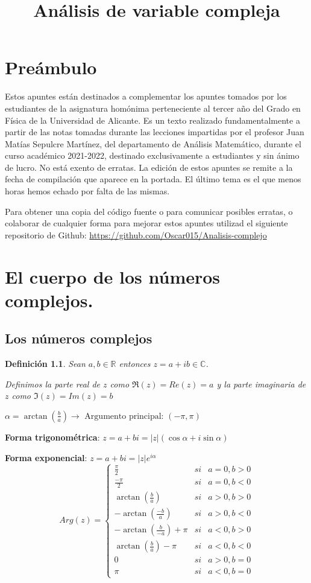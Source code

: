 \documentclass[10pt]{book}
\title{Análisis de variable compleja}
\newtheorem{defi}{Definición}[chapter]
\newcommand{\R}{\mathbb{R}}
\newcommand{\C}{\mathbb{C}}
\begin{document}
\maketitle
\tableofcontents
\chapter*{Preámbulo}
Estos apuntes están destinados a complementar los apuntes tomados por
los estudiantes de la asignatura homónima perteneciente al tercer año del
Grado en Física de la Universidad de Alicante.
Es un texto realizado fundamentalmente a partir de las notas tomadas
durante las lecciones impartidas por el profesor Juan Matías Sepulcre Martínez, del departamento
de Análisis Matemático, durante el curso académico 2021-2022, destinado exclusivamente a estudiantes y sin ánimo de lucro.
No está exento de erratas. La edición de estos apuntes se remite a la fecha de compilación que aparece en la portada. El último tema es el que menos horas hemos echado por falta de las mismas. 

Para obtener una copia del código fuente o para comunicar posibles erratas, o colaborar de cualquier forma para mejorar estos apuntes utilizad el siguiente repositorio de Github: {\color{blue}\url{https://github.com/Oscar015/Analisis-complejo}}


\chapter{El cuerpo de los números complejos.}
\section{Los números complejos}

\begin{defi}
Sean $a,b \in\R$ entonces $z = a + ib \in \C$.

Definimos la parte real de $z$ como $\Re(z) = Re(z) = a$ y la parte imaginaria de $z$ como $\Im(z) = Im(z) = b$
\end{defi}


 $\alpha = \arctan (\frac{b}{a}) \longrightarrow \text{ Argumento principal: } (-\pi,\pi)$
 
 \textbf{Forma trigonométrica}: $z = a+bi = |z|(\cos \alpha + i\sin \alpha)$
 
 \textbf{Forma exponencial}: $z = a+bi = |z|e^{i\alpha}$
$$ 
	Arg(z)= \left\{ \begin{array}{lcc}
	\frac{\pi}{2} & si & a=0,b>0 \\
	\frac{-\pi}{2} & si & a=0,b<0\\
	\arctan (\frac{b}{a}) & si & a>0,b>0\\
	-\arctan (\frac{-b}{a}) & si & a>0, b<0\\
	-\arctan (\frac{b}{-a}) + \pi & si &  a<0,b>0\\
	\arctan (\frac{b}{a}) - \pi & si & a<0,b<0\\
	0 & si & a>0,b=0\\
	\pi & si & a<0, b=0
	\end{array}
\right.  
$$
\end{document}
